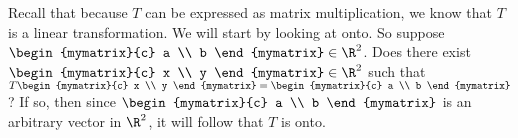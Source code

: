 \begin{solution} Recall that because $T$ can be expressed as matrix
multiplication, we know that $T$ is a linear transformation.  We will
start by looking at onto.  So suppose $\begin{mymatrix}{c}
a \\
b
\end{mymatrix} \in \R^{2}$. Does there exist $\begin{mymatrix}{c}
x \\
y
\end{mymatrix}  \in \R^2 $ such that $T\begin{mymatrix}{c}
x \\
y
\end{mymatrix} =\begin{mymatrix}{c}
a \\
b
\end{mymatrix}$? If so, then since $\begin{mymatrix}{c}
a \\
b
\end{mymatrix} $ is an arbitrary vector in $\R^{2}$, it will follow that $T$
is onto.


\end{solution}

